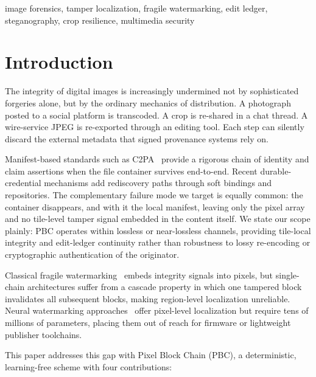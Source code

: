 \documentclass[conference]{IEEEtran}
\begin{document}
\begin{IEEEkeywords}
image forensics, tamper localization, fragile watermarking, edit ledger, steganography, crop resilience, multimedia security
\end{IEEEkeywords}

\section{Introduction}
\label{sec:intro}

The integrity of digital images is increasingly undermined not by
sophisticated forgeries alone, but by the ordinary mechanics of
distribution. A photograph posted to a social platform is transcoded.
A crop is re-shared in a chat thread. A wire-service JPEG is
re-exported through an editing tool. Each step can silently discard
the external metadata that signed provenance systems rely on.

Manifest-based standards such as C2PA~\cite{c2pa_spec} provide a
rigorous chain of identity and claim assertions when the file container
survives end-to-end. Recent durable-credential mechanisms add
rediscovery paths through soft bindings and repositories. The
complementary failure mode we target is equally common: the container
disappears, and with it the local manifest, leaving only the pixel
array and no tile-level tamper signal embedded in the content itself. We state our scope plainly: PBC operates within lossless or near-lossless channels, providing tile-local integrity and edit-ledger continuity rather than robustness to lossy re-encoding or cryptographic authentication of the originator.

Classical fragile watermarking~\cite{he2008blockchain,fang2020blockchain}
embeds integrity signals into pixels, but single-chain architectures
suffer from a cascade property in which one tampered block invalidates
all subsequent blocks, making region-level localization unreliable.
Neural watermarking approaches~\cite{editguard,omniguard} offer
pixel-level localization but require tens of millions of parameters,
placing them out of reach for firmware or lightweight publisher
toolchains.

This paper addresses this gap with Pixel Block Chain (PBC), a
deterministic, learning-free scheme with four contributions:
\end{document}
